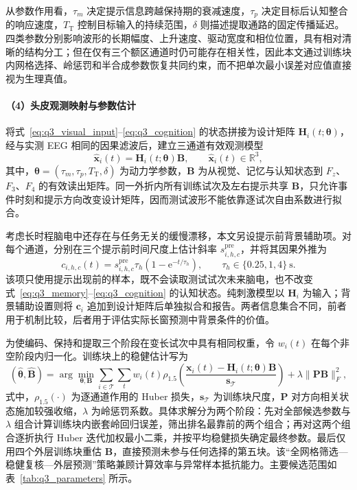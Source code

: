 \documentclass[a4paper,zihao=-4,linespread=1]{ctexart}
\numberwithin{figure}{section}       %
\begin{document}
从参数作用看，$\tau_m$ 决定提示信息跨越保持期的衰减速度，$\tau_p$ 决定目标后认知整合的响应速度，$T_{\mathrm T}$ 控制目标输入的持续范围，$\delta$ 则描述提取通路的固定传播延迟。四类参数分别影响波形的长期幅度、上升速度、驱动宽度和相位位置，具有相对清晰的结构分工；但在仅有三个额区通道时仍可能存在相关性，因此本文通过训练块内网格选择、岭惩罚和半合成参数恢复共同约束，而不把单次最小误差对应值直接视为生理真值。

\paragraph{（4）头皮观测映射与参数估计}

将式~\eqref{eq:q3_visual_input}--\eqref{eq:q3_cognition} 的状态拼接为设计矩阵 $\boldsymbol H_i(t;\boldsymbol\theta)$，经与实测 EEG 相同的因果滤波后，建立三通道有效观测模型
\begin{equation}
\widehat{\boldsymbol x}_i(t)=\boldsymbol H_i(t;\boldsymbol\theta)\boldsymbol B,
\qquad \widehat{\boldsymbol x}_i(t)\in\mathbb R^3,
\tag{3-6}
\label{eq:q3_observation}
\end{equation}
其中，$\boldsymbol\theta=(\tau_m,\tau_p,T_{\mathrm T},\delta)$ 为动力学参数，$\boldsymbol B$ 为从视觉、记忆与认知状态到 $F_z$、$F_3$、$F_4$ 的有效读出矩阵。同一外折内所有训练试次及左右提示共享 $\boldsymbol B$，只允许事件时刻和提示方向改变设计矩阵，因而测试波形不能依靠逐试次自由系数进行拟合。

考虑长时程脑电中还存在与任务无关的缓慢漂移，本文另设提示前背景辅助项。对每个通道，分别在三个提示前时间尺度上估计斜率 $s_{i,h,c}^{\mathrm{pre}}$，并将其因果外推为
\[
c_{i,h,c}(t)=s_{i,h,c}^{\mathrm{pre}}\tau_h
\left(1-\mathrm e^{-t/\tau_h}\right),
\qquad \tau_h\in\{0.25,1,4\}~\mathrm{s}.
\]
该项只使用提示出现前的样本，既不会读取测试试次未来脑电，也不改变式~\eqref{eq:q3_memory}--\eqref{eq:q3_cognition} 的认知状态。纯刺激模型以 $\boldsymbol H_i$ 为输入；背景辅助设置则将 $\boldsymbol c_i$ 追加到设计矩阵后单独拟合和报告。两者信息集合不同，前者用于机制比较，后者用于评估实际长窗预测中背景条件的价值。

为使编码、保持和提取三个阶段在变长试次中具有相同权重，令 $w_i(t)$ 在每个非空阶段内归一化。训练块上的稳健估计写为
\begin{equation}
(\widehat{\boldsymbol\theta},\widehat{\boldsymbol B})
=\arg\min_{\boldsymbol\theta,\boldsymbol B}
\sum_{i\in\mathcal T}\sum_t w_i(t)
\rho_{1.5}\!\left(
\frac{\boldsymbol x_i(t)-\boldsymbol H_i(t;\boldsymbol\theta)\boldsymbol B}
{\boldsymbol s_{\mathcal T}}
\right)
+\lambda\|\boldsymbol P\boldsymbol B\|_F^2,
\tag{3-7}
\label{eq:q3_fit}
\end{equation}
式中，$\rho_{1.5}(\cdot)$ 为逐通道作用的 Huber 损失，$\boldsymbol s_{\mathcal T}$ 为训练块尺度，$\boldsymbol P$ 对方向相关状态施加较强收缩，$\lambda$ 为岭惩罚系数。具体求解分为两个阶段：先对全部候选参数与 $\lambda$ 组合计算训练块内嵌套岭回归误差，筛出排名最靠前的两个组合；再对这两个组合逐折执行 Huber 迭代加权最小二乘，并按平均稳健损失确定最终参数。最后仅用四个外层训练块重估 $\boldsymbol B$，直接预测未参与任何选择的第五块。该“全网格筛选---稳健复核---外层预测”策略兼顾计算效率与异常样本抵抗能力。主要候选范围如表~\ref{tab:q3_parameters} 所示。
\end{document}

